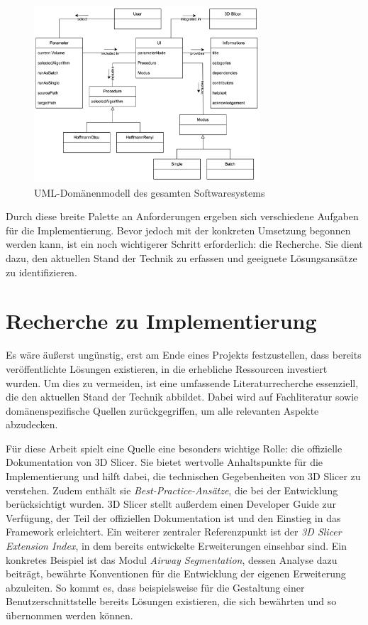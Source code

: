 \begin{figure}[h]
	\centering
	\includegraphics[width=0.75\textwidth]{img/domaenenmodell.jpg}
	\caption{UML-Domänenmodell des gesamten Softwaresystems}
	\label{fig:3d_slicer_domäne}
\end{figure}

Durch diese breite Palette an Anforderungen ergeben sich verschiedene Aufgaben
für die Implementierung. Bevor jedoch mit der konkreten Umsetzung begonnen werden
kann, ist ein noch wichtigerer Schritt erforderlich: die Recherche. Sie dient
dazu, den aktuellen Stand der Technik zu erfassen und geeignete Lösungsansätze zu
identifizieren.

\section{Recherche zu Implementierung}
Es wäre äußerst ungünstig, erst am Ende eines Projekts festzustellen, dass bereits
veröffentlichte Lösungen existieren, in die erhebliche Ressourcen investiert
wurden. Um dies zu vermeiden, ist eine umfassende Literaturrecherche essenziell,
die den aktuellen Stand der Technik abbildet. Dabei wird auf Fachliteratur sowie
domänenspezifische Quellen zurückgegriffen, um alle relevanten Aspekte abzudecken.

Für diese Arbeit spielt eine Quelle eine besonders wichtige Rolle: die
offizielle Dokumentation von 3D Slicer. Sie bietet wertvolle Anhaltspunkte für die
Implementierung und hilft dabei, die technischen Gegebenheiten von 3D Slicer zu
verstehen. Zudem enthält sie \textit{Best-Practice-Ansätze}, die bei der Entwicklung
berücksichtigt wurden. 3D Slicer stellt außerdem einen Developer Guide zur
Verfügung, der Teil der offiziellen Dokumentation ist und den Einstieg in das Framework
erleichtert. Ein weiterer zentraler Referenzpunkt ist der \textit{3D Slicer
Extension Index}, in dem bereits entwickelte Erweiterungen einsehbar sind. Ein konkretes
Beispiel ist das Modul \textit{Airway Segmentation}, dessen Analyse dazu beiträgt,
bewährte Konventionen für die Entwicklung der eigenen Erweiterung abzuleiten. So
kommt es, dass beispielsweise für die Gestaltung einer Benutzerschnittstelle
bereits Lösungen existieren, die sich bewährten und so übernommen werden können.


